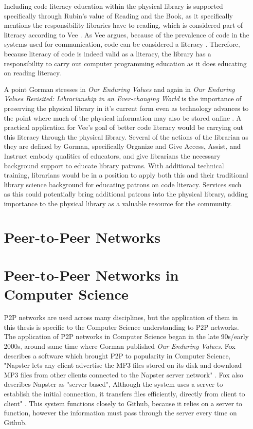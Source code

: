 Including code literacy education within the physical library is supported specifically through Rubin's value of Reading and the Book, as it specifically mentions the responsibility libraries have to reading, which is considered part of literacy according to Vee \cite{rubin2016foundationslis} \cite{vee2017coding}. As Vee argues, because of the prevalence of code in the systems used for communication, code can be considered a literacy \cite{vee2017coding}. Therefore, because literacy of code is indeed valid as a literacy, the library has a responsibility to carry out computer programming education as it does educating on reading literacy. 

A point Gorman stresses in \textit{Our Enduring Values} and again in \textit{Our Enduring Values Revisited: Librarianship in an Ever-changing World} is the importance of preserving the physical library in it's current form even as technology advances to the point where much of the physical information may also be stored online \cite{gorman2000values}\cite{gorman2015revisited}. A practical application for Vee's goal of better code literacy would be carrying out this literacy through the physical library. Several of the actions of the librarian as they are defined by Gorman, specifically Organize and Give Access, Assist, and Instruct embody qualities of educators, and give librarians the necessary background support to educate library patrons. With additional technical training, librarians would be in a position to apply both this and their traditional library science background for educating patrons on code literacy. Services such as this could potentially bring additional patrons into the physical library, adding importance to the physical library as a valuable resource for the community.

\section{Peer-to-Peer Networks}
\label{sec:peertopeermodel}

\section{Peer-to-Peer Networks in Computer Science}

P2P networks are used across many disciplines, but the application of them in this thesis is specific to the Computer Science understanding to P2P networks. The application of P2P networks in Computer Science began in the late 90s/early 2000s, around same time where Gorman published \textit{Our Enduring Values}. Fox describes a software which brought P2P to popularity in Computer Science, "Napster lets any
client advertise the MP3 files stored on its disk and download MP3 files from other clients connected to the Napster server network" \cite{fox2001peer}. Fox also describes Napster as "server-based", Although the system uses a
server to establish the initial connection, it transfers files efficiently, directly from client to client" \cite{fox2001peer}. This system functions closely to Github, because it relies on a server to function, however the information must pass through the server every time on Github. 

